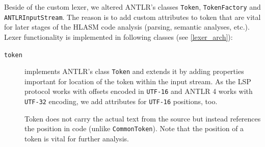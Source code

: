 Beside of the custom lexer, we altered ANTLR's classes \texttt{Token}, \texttt{TokenFactory} and \texttt{ANTLRInputStream}. The reason is to add custom attributes to token that are vital for later stages of the HLASM code analysis (parsing, semantic analyses, etc.). Lexer functionality is implemented in following classes (see \cref{lexer_arch}):



\begin{description}
	
	\item[\texttt{token}] implements ANTLR's class \texttt{Token} and extends it by adding properties important for location of the token within the input stream. As the LSP protocol works with offsets encoded in \texttt{UTF-16} and ANTLR 4 works with \texttt{UTF-32} encoding, we add attributes for \texttt{UTF-16} positions, too.
	
	Token does not carry the actual text from the source but instead references the position in code (unlike \texttt{CommonToken}). Note that the position of a token is vital for further analysis.
	

\end{description}
